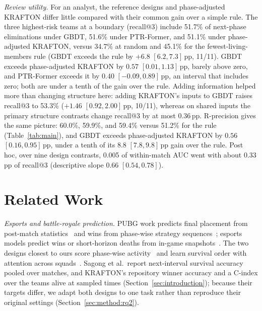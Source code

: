 \documentclass[sigconf,anonymous]{acmart}
\begin{document}
\emph{Review utility.} For an analyst, the reference designs and phase-adjusted KRAFTON differ little compared with their common gain over a simple rule. The three highest-risk teams at a boundary (recall@3) include 51.7\% of next-phase eliminations under GBDT, 51.6\% under PTR-Former, and 51.1\% under phase-adjusted KRAFTON, versus 34.7\% at random and 45.1\% for the fewest-living-members rule (GBDT exceeds the rule by $+6.8$ $[6.2,\allowbreak 7.3]$\,pp, 11/11). GBDT exceeds phase-adjusted KRAFTON by $0.57$ $[0.01,\allowbreak 1.13]$\,pp, barely above zero, and PTR-Former exceeds it by $0.40$ $[-0.09,\allowbreak 0.89]$\,pp, an interval that includes zero; both are under a tenth of the gain over the rule. Adding information helped more than changing structure here: adding KRAFTON's inputs to GBDT raises recall@3 to 53.3\% ($+1.46$ $[0.92,\allowbreak 2.00]$\,pp, 10/11), whereas on shared inputs the primary structure contrasts change recall@3 by at most 0.36\,pp. R-precision gives the same picture: 60.0\%, 59.9\%, and 59.4\% versus 51.2\% for the rule (Table~\ref{tab:main}), and GBDT exceeds phase-adjusted KRAFTON by $0.56$ $[0.16,\allowbreak 0.95]$\,pp, under a tenth of its $8.8$ $[7.8,\allowbreak 9.8]$\,pp gain over the rule. Post hoc, over nine design contrasts, 0.005 of within-match AUC went with about 0.33\,pp of recall@3 (descriptive slope 0.66 $[0.54,\allowbreak 0.78]$).

\section{Related Work}
\label{sec:related}
\emph{Esports and battle-royale prediction.} PUBG work predicts final placement from post-match statistics~\cite{KagglePUBG,LeeLee25} and wins from phase-wise strategy sequences~\cite{SagongKim25}; esports models predict wins or short-horizon deaths from in-game snapshots~\cite{Hodge21,Katona19,Marshall22}. The two designs closest to ours score phase-wise activity~\cite{Sagong25a} and learn survival order with attention across squads~\cite{KRAFTON}. Sagong et al.\ report next-interval survival accuracy pooled over matches, and KRAFTON's repository winner accuracy and a C-index over the teams alive at sampled times (Section~\ref{sec:introduction}); because their targets differ, we adapt both designs to one task rather than reproduce their original settings (Section~\ref{sec:method:rq2}).
\end{document}
